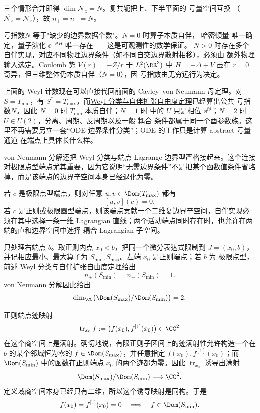 三个情形合并即得 $\dim\mathcal N_z=N$。复共轭把上、下半平面的 亏量空间互换
（$\overline{\mathcal N_z}=\mathcal N_{\overline z}$），故 $n_+=n_-=N$。

亏指数$N$ 等于"缺少的边界数据个数"。$N=0$ 时算子本质自伴，
哈密顿量 唯一确定，量子演化 $\ee^{-\ii tH}$ 唯一存在——这是可观测性的数学保证。
$N>0$ 时存在多个自伴实现，对应不同物理边界条件（如不同自交边界散射相移），必须由
额外物理输入选定。Coulomb 势 $V(r)=-Z/r$ 于 $L^2(\RR^3)$ 中 $H=-\Delta+V$ 虽在 $r=0$
奇异，但三维整体仍本质自伴（$N=0$），因 亏指数由无穷远行为决定。

上面的 Weyl 计数现在可以直接代回前面的 Cayley--von Neumann 母定理。对 $S=T_{\min}$，有 $S^*=T_{\max}$，而\hyperref[thm:math-sl-weyl-extension-count]{Weyl 分类与自伴扩张自由度定理}已经算出公共 亏指数$N$。因此 $N=0$ 时 $T_{\min}$ 本质自伴；$N=1$ 时 中的 $U$ 只是相位 $\ee^{\ii\vartheta}$；$N=2$ 时 $U\in U(2)$，分离、周期、反周期以及一般 耦合 条件都属于同一个酉参数族。这里不再需要另立一套“ODE 边界条件分类”；ODE 的工作只是计算 abstract 亏量 通道 在端点上具体长什么样。

von Neumann 分解还把 Weyl 分类与端点 Lagrange 边界型严格接起来。这个连接对极限点型端点尤其重要，因为它说明“无需边界条件”不是把某个函数值条件省略掉，而是该端点的边界辛空间本身已经退化为零。

\begin{theorem}\label{thm:math-sl-limit-point-boundary-form}
若 $c$ 是极限点型端点，则对任意 $u,v\in\Dom(T_{\max})$ 都有
\[
 [u,v](c)=0.
\]
若 $c$ 是正则或极限圆型端点，则该端点贡献一个二维复边界辛空间，自伴实现必须在其中选择一条一维 Lagrangian 直线；两个活动端点同时存在时，也允许在两端的直和边界空间中选择 耦合 Lagrangian 子空间。
\end{theorem}

只处理右端点 $b$。取正则内点 $x_0<b$，把同一个微分表达式限制到 $J=(x_0,b)$，并记相应最小、最大算子为 $S_{\min},S_{\max}$。左端 $x_0$ 是正则端点；若 $b$ 为 极限点型，前述 Weyl 分类与自伴扩张自由度定理给出
\[
 n_+(S_{\min})=n_-(S_{\min})=1.
\]
von Neumann 分解因此给出
\[
 \dim_\CC\bigl(\Dom(S_{\max})/\Dom(S_{\min})\bigr)=2.
\]

正则端点迹映射
\[
 \operatorname{tr}_{x_0}f
 :=\bigl(f(x_0),f^{[1]}(x_0)\bigr)\in\CC^2
\]
在这个商空间上是满射。确切地说，有限正则子区间上的迹满射性允许构造一个在 $b$ 的某个邻域恒为零的 $f\in\Dom(S_{\max})$，并任意指定 $f(x_0),f^{[1]}(x_0)$；而 $\Dom(S_{\min})$ 中的函数在正则端点 $x_0$ 的两个迹都为零。因此 $\operatorname{tr}_{x_0}$ 诱导出满射
\[
 \Dom(S_{\max})/\Dom(S_{\min})\longrightarrow\CC^2.
\]
定义域商空间本身已经只有二维，所以这个诱导映射是同构。于是
\[
 f(x_0)=f^{[1]}(x_0)=0
 \quad\Longrightarrow\quad
 f\in\Dom(S_{\min}).
\]

